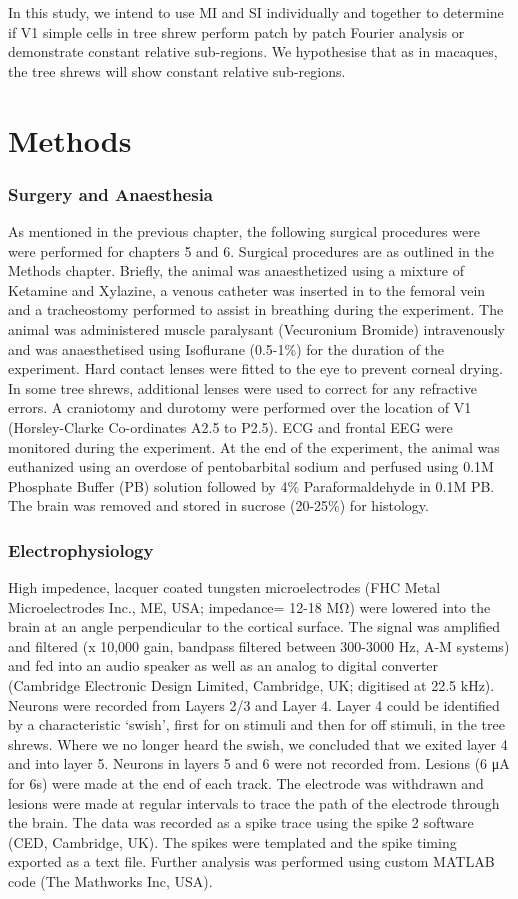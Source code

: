 	In this study, we intend to use MI and SI individually and together to determine if V1 simple cells in tree shrew perform patch by patch Fourier analysis or demonstrate constant relative sub-regions. We hypothesise that as in macaques, the tree shrews will show constant relative sub-regions.
	
	\section{Methods}
	
	\subsubsection{Surgery and Anaesthesia}
	
	As mentioned in the previous chapter, the following surgical procedures were were performed for chapters 5 and 6. Surgical procedures are as outlined in the Methods chapter. Briefly, the animal was anaesthetized using a mixture of Ketamine and Xylazine, a venous catheter was inserted in to the femoral vein and a tracheostomy performed to assist in breathing during the experiment. The animal was administered muscle paralysant (Vecuronium Bromide) intravenously and was anaesthetised using Isoflurane (0.5-1\%) for the duration of the experiment. Hard contact lenses were fitted to the eye to prevent corneal drying. In some tree shrews, additional lenses were used to correct for any refractive errors. A craniotomy and durotomy were performed over the location of V1 (Horsley-Clarke Co-ordinates A2.5 to P2.5). ECG and frontal EEG were monitored during the experiment. At the end of the experiment, the animal was euthanized using an overdose of pentobarbital sodium and perfused using 0.1M Phosphate Buffer (PB) solution followed by 4\% Paraformaldehyde in 0.1M PB. The brain was removed and stored in sucrose (20-25\%) for histology.	
	
		\subsubsection{Electrophysiology}
		High impedence, lacquer coated tungsten microelectrodes (FHC Metal Microelectrodes Inc., ME, USA; impedance= 12-18 MΩ) were lowered into the brain at an angle perpendicular to the cortical surface. The signal was amplified and filtered (x 10,000 gain, bandpass filtered between 300-3000 Hz, A-M systems) and fed into an audio speaker as well as an analog to digital converter (Cambridge Electronic Design Limited, Cambridge, UK; digitised at 22.5 kHz). Neurons were recorded from Layers 2/3 and Layer 4. Layer 4 could be identified by a characteristic ‘swish’, first for on stimuli and then for off stimuli, in the tree shrews. Where we no longer heard the swish, we concluded that we exited layer 4 and into layer 5. Neurons in layers 5 and 6 were not recorded from. Lesions (6 μA for 6s) were made at the end of each track. The electrode was withdrawn and lesions were made at regular intervals to trace the path of the electrode through the brain. The data was recorded as a spike trace using the spike 2 software (CED, Cambridge, UK). The spikes were templated and the spike timing exported as a text file. Further analysis was performed using custom MATLAB code (The Mathworks Inc, USA).
